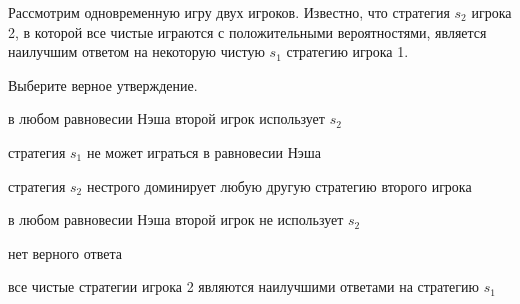 
\begin{question}
Рассмотрим одновременную игру двух игроков.
Известно, что стратегия \(s_2\) игрока 2, в которой все чистые играются с положительными вероятностями,
является наилучшим ответом на некоторую чистую \(s_1\) стратегию игрока 1.

Выберите верное утверждение.
\begin{answerlist}
  \item в любом равновесии Нэша второй игрок использует \(s_2\)
  \item стратегия \(s_1\) не может играться в равновесии Нэша
  \item стратегия \(s_2\) нестрого доминирует любую другую стратегию второго игрока
  \item в любом равновесии Нэша второй игрок не использует \(s_2\)
  \item нет верного ответа
  \item все чистые стратегии игрока 2 являются наилучшими ответами на стратегию \(s_1\)
\end{answerlist}
\end{question}


